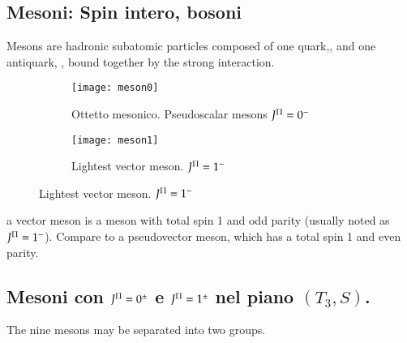 \documentclass[main.tex]{subfiles}
\begin{document}
\subsection{Mesoni: Spin intero, bosoni}
Mesons are hadronic subatomic particles composed of one quark,\Pq, and one antiquark, \Paq, bound together by the strong interaction.

\begin{figure}
    \centering
    \begin{subfigure}[b]{0.45\textwidth}
    \centering
        \texttt{[image: meson0]}
\caption{Ottetto mesonico. Pseudoscalar mesons $J^{\Pi}=0^-$}
\label{fig:meson0}
    \end{subfigure}
    \hfill
    \begin{subfigure}[b]{0.45\textwidth}
    \centering
        \texttt{[image: meson1]}
\caption{ Lightest vector meson. $J^{\Pi}=1^-$}
        \label{fig:meson1}
    \end{subfigure}
   
\end{figure}

a vector meson is a meson with total spin 1 and odd parity (usually noted as $J^{\Pi}=1^-$). Compare to a pseudovector meson, which has a total spin 1 and even parity.

\subsection{Mesoni con $J^{\Pi}=0^{\pm}$ e $J^{\Pi}=1^{\pm}$ nel piano $(T_3,S)$.}

The nine mesons may be separated into two groups.
\end{document}
